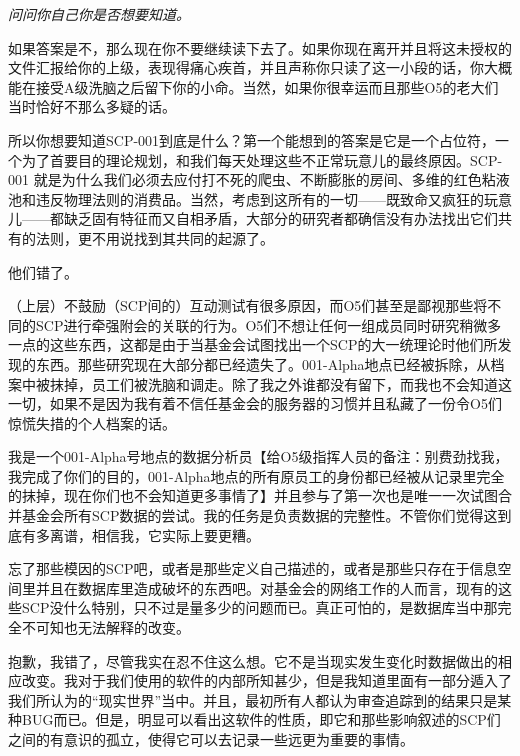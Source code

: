 \documentclass[openany,a4paper]{book} %
\begin{document}
\begin{colorboxed}
\itshape
问问你自己你是否想要知道。\vspace{12pt}

如果答案是不，那么现在你不要继续读下去了。如果你现在离开并且将这未授权的文件汇报给你的上级，表现得痛心疾首，并且声称你只读了这一小段的话，你大概能在接受A级洗脑之后留下你的小命。当然，如果你很幸运而且那些O5的老大们当时恰好不那么多疑的话。\vspace{12pt}

所以你想要知道SCP-001到底是什么？第一个能想到的答案是它是一个占位符，一个为了首要目的理论规划，和我们每天处理这些不正常玩意儿的最终原因。SCP-001 就是为什么我们必须去应付打不死的爬虫、不断膨胀的房间、多维的红色粘液池和违反物理法则的消费品。当然，考虑到这所有的一切——既致命又疯狂的玩意儿——都缺乏固有特征而又自相矛盾，大部分的研究者都确信没有办法找出它们共有的法则，更不用说找到其共同的起源了。\vspace{12pt}

他们错了。\vspace{12pt}

（上层）不鼓励（SCP间的）互动测试有很多原因，而O5们甚至是鄙视那些将不同的SCP进行牵强附会的关联的行为。O5们不想让任何一组成员同时研究稍微多一点的这些东西，这都是由于当基金会试图找出一个SCP的大一统理论时他们所发现的东西。那些研究现在大部分都已经遗失了。001-Alpha地点已经被拆除，从档案中被抹掉，员工们被洗脑和调走。除了我之外谁都没有留下，而我也不会知道这一切，如果不是因为我有着不信任基金会的服务器的习惯并且私藏了一份令O5们惊慌失措的个人档案的话。\vspace{12pt}

我是一个001-Alpha号地点的数据分析员【给O5级指挥人员的备注：别费劲找我，我完成了你们的目的，001-Alpha地点的所有原员工的身份都已经被从记录里完全的抹掉，现在你们也不会知道更多事情了】并且参与了第一次也是唯一一次试图合并基金会所有SCP数据的尝试。我的任务是负责数据的完整性。不管你们觉得这到底有多离谱，相信我，它实际上要更糟。\vspace{12pt}

忘了那些模因的SCP吧，或者是那些定义自己描述的，或者是那些只存在于信息空间里并且在数据库里造成破坏的东西吧。对基金会的网络工作的人而言，现有的这些SCP没什么特别，只不过是量多少的问题而已。真正可怕的，是数据库当中那完全不可知也无法解释的改变。\vspace{12pt}

抱歉，我错了，尽管我实在忍不住这么想。它不是当现实发生变化时数据做出的相应改变。我对于我们使用的软件的内部所知甚少，但是我知道里面有一部分遁入了我们所认为的“现实世界”当中。并且，最初所有人都认为审查追踪到的结果只是某种BUG而已。但是，明显可以看出这软件的性质，即它和那些影响叙述的SCP们之间的有意识的孤立，使得它可以去记录一些远更为重要的事情。\vspace{12pt}


\end{colorboxed}
\end{document}
